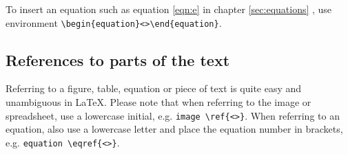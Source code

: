 To insert an equation such as equation \eqref{eqn:e} in chapter \ref{sec:equations} , use environment \verb|\begin{equation}<>\end{equation}|.

\subsection{References to parts of the text}\label{sec:references}

Referring to a figure, table, equation or piece of text is quite easy and unambiguous in \LaTeX. Please note that when referring to the image or spreadsheet, use a lowercase initial, e.g. \verb|image \ref{<>}|. When referring to an equation, also use a lowercase letter and place the equation number in brackets, e.g. \verb|equation \eqref{<>}|.



